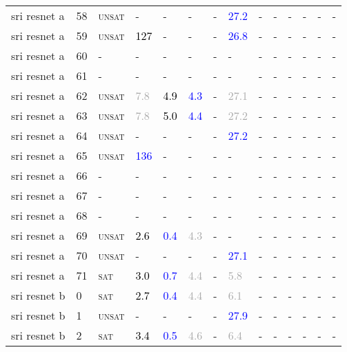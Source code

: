 \begin{center}
{\begin{longtable}{@{}llllllllllllll@{}}
sri resnet a & 58 & \textsc{unsat} & - & - & - & - & \textcolor{blue}{27.2} & - & - & - & - & - & - \\
sri resnet a & 59 & \textsc{unsat} & \textcolor{black}{127} & - & - & - & \textcolor{blue}{26.8} & - & - & - & - & - & - \\
sri resnet a & 60 & - & - & - & - & - & - & - & - & - & - & - & - \\
sri resnet a & 61 & - & - & - & - & - & - & - & - & - & - & - & - \\
sri resnet a & 62 & \textsc{unsat} & \textcolor{darkgray}{7.8} & \textcolor{black}{4.9} & \textcolor{blue}{4.3} & - & \textcolor{darkgray}{27.1} & - & - & - & - & - & - \\
sri resnet a & 63 & \textsc{unsat} & \textcolor{darkgray}{7.8} & \textcolor{black}{5.0} & \textcolor{blue}{4.4} & - & \textcolor{darkgray}{27.2} & - & - & - & - & - & - \\
sri resnet a & 64 & \textsc{unsat} & - & - & - & - & \textcolor{blue}{27.2} & - & - & - & - & - & - \\
sri resnet a & 65 & \textsc{unsat} & \textcolor{blue}{136} & - & - & - & - & - & - & - & - & - & - \\
sri resnet a & 66 & - & - & - & - & - & - & - & - & - & - & - & - \\
sri resnet a & 67 & - & - & - & - & - & - & - & - & - & - & - & - \\
sri resnet a & 68 & - & - & - & - & - & - & - & - & - & - & - & - \\
sri resnet a & 69 & \textsc{unsat} & \textcolor{black}{2.6} & \textcolor{blue}{0.4} & \textcolor{darkgray}{4.3} & - & - & - & - & - & - & - & - \\
sri resnet a & 70 & \textsc{unsat} & - & - & - & - & \textcolor{blue}{27.1} & - & - & - & - & - & - \\
sri resnet a & 71 & \textsc{sat} & \textcolor{black}{3.0} & \textcolor{blue}{0.7} & \textcolor{darkgray}{4.4} & - & \textcolor{darkgray}{5.8} & - & - & - & - & - & - \\
sri resnet b & 0 & \textsc{sat} & \textcolor{black}{2.7} & \textcolor{blue}{0.4} & \textcolor{darkgray}{4.4} & - & \textcolor{darkgray}{6.1} & - & - & - & - & - & - \\
sri resnet b & 1 & \textsc{unsat} & - & - & - & - & \textcolor{blue}{27.9} & - & - & - & - & - & - \\
sri resnet b & 2 & \textsc{sat} & \textcolor{black}{3.4} & \textcolor{blue}{0.5} & \textcolor{darkgray}{4.6} & - & \textcolor{darkgray}{6.4} & - & - & - & - & - & - \\

\end{longtable}}
\end{center}
